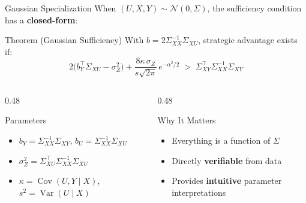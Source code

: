 \documentclass[aspectratio=169, 10pt]{beamer}
\DeclareMathOperator{\Var}{Var}
\DeclareMathOperator{\Cov}{Cov}
\begin{document}
\begin{frame}{Gaussian Specialization}
  When $(U, X, Y) \sim \mathcal{N}(0, \Sigma)$, the sufficiency condition has a \textbf{closed-form}:

  \vspace{4pt}
  \begin{alertblock}{Theorem (Gaussian Sufficiency)}
    With $b = 2\Sigma_{XX}^{-1}\Sigma_{XU}$, strategic advantage exists if:
    $$2\bigl(b_Y^\top \Sigma_{XU} - \sigma_Z^2\bigr) + \frac{8\kappa\,\sigma_Z}{s\sqrt{2\pi}}\, e^{-\alpha^2/2} \;>\; \Sigma_{XY}^\top \Sigma_{XX}^{-1} \Sigma_{XY}$$
  \end{alertblock}
  \vspace{2pt}
  \begin{columns}[T]
    \begin{column}{0.48\textwidth}
      \begin{block}{Parameters}
        \begin{itemize}
          \item $b_Y = \Sigma_{XX}^{-1}\Sigma_{XY}$,\; $b_U = \Sigma_{XX}^{-1}\Sigma_{XU}$
          \item $\sigma_Z^2 = \Sigma_{XU}^\top \Sigma_{XX}^{-1}\Sigma_{XU}$
          \item $\kappa = \Cov(U, Y \mid X)$,\; $s^2 = \Var(U \mid X)$
        \end{itemize}
      \end{block}
    \end{column}
    \begin{column}{0.48\textwidth}
      \begin{exampleblock}{Why It Matters}
        \begin{itemize}
          \item Everything is a function of $\Sigma$
          \item Directly \textbf{verifiable} from data
          \item Provides \textbf{intuitive} parameter interpretations
        \end{itemize}
      \end{exampleblock}
    \end{column}
  \end{columns}
\end{frame}
\end{document}
